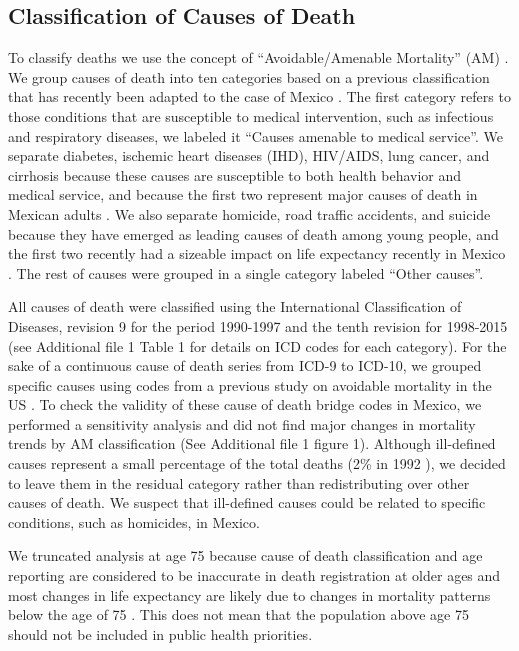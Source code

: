 \documentclass{bmcart}
\begin{document}
\subsection*{Classification of Causes of Death}
To classify deaths we use the concept of ``Avoidable/Amenable Mortality'' (AM) \cite{nolte&mckee2004, nolte&mckee2008}. We group causes of death into ten categories based on a previous classification  \cite{elo2014} that has recently been adapted to the case of Mexico \cite{Aburto2015}. The first category refers to those conditions that are susceptible to medical intervention, such as infectious and respiratory diseases, we labeled it ``Causes amenable to medical service''. We separate diabetes, ischemic heart diseases (IHD), HIV/AIDS, lung
cancer, and cirrhosis because these causes are susceptible to both health behavior
and medical service, and because the first two represent major causes of death
in Mexican adults \cite{gomez2016dissonant}. We also separate
homicide, road traffic accidents, and suicide because they have emerged as
leading causes of death among young people, and the first two recently had a sizeable
impact on life expectancy recently in Mexico \cite{Aburto2015}. The rest of causes were grouped in a single category labeled ``Other causes''. 

All causes of death were classified using the International Classification of Diseases, revision 9 for the period 1990-1997 and the tenth revision for 1998-2015 (see Additional file 1 Table 1 for details on ICD codes for each category). For the sake of a continuous cause of death series from ICD-9 to ICD-10, we grouped specific causes using codes from a previous study on avoidable mortality in the US \cite{elo2014}. To check the validity of these cause of death bridge codes in Mexico, we performed a sensitivity analysis and did not find major changes in mortality trends by AM classification (See Additional file 1 figure 1). Although ill-defined causes represent a small percentage of the total deaths (2\% in 1992 \cite{rivera2002epidemiological}), we decided to leave them in the residual category rather than redistributing over other causes of death. We suspect that ill-defined causes could be related to specific conditions, such as homicides, in Mexico.

We truncated analysis at age 75 because cause of death classification and age reporting are considered to be inaccurate in death registration at older ages \cite{tobias2001} and most changes in life expectancy are likely due to changes in mortality patterns below the age of 75 \cite{Aburto2015}. This does not mean that the population above age 75 should not be included in public health priorities.
\end{document}
